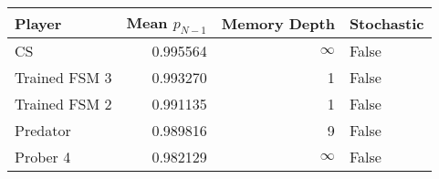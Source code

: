 \begin{tabular}{lrrl}
\toprule
        Player &  Mean $p_{N-1}$ &  Memory Depth & Stochastic \\
\midrule
            CS &        0.995564 &            \(\infty\) &      False \\
 Trained FSM 3 &        0.993270 &             1 &      False \\
 Trained FSM 2 &        0.991135 &             1 &      False \\
      Predator &        0.989816 &             9 &      False \\
      Prober 4 &        0.982129 &            \(\infty\) &      False \\
\bottomrule
\end{tabular}
